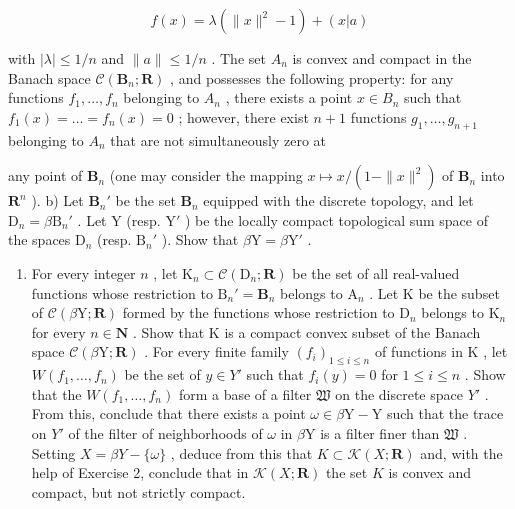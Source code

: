 \[
f (x) = \lambda (\| x \| ^ {2} - 1) + (x | a)
\]

with \(|\lambda| \leqslant 1/n\) and \(\|a\| \leqslant 1/n\) . The set \(A_n\) is convex and compact in the Banach space \(\mathcal{C}(\mathbf{B}_n; \mathbf{R})\) , and possesses the following property: for any functions \(f_1, \ldots, f_n\) belonging to \(A_n\) , there exists a point \(x \in B_n\) such that \(f_1(x) = \ldots = f_n(x) = 0\) ; however, there exist \(n + 1\) functions \(g_1, \ldots, g_{n+1}\) belonging to \(A_n\) that are not simultaneously zero at

any point of \(\mathbf{B}_n\) (one may consider the mapping \(x \mapsto x / (1 - \|x\|^2)\) of \(\mathbf{B}_n\) into \(\mathbf{R}^n\) ). b) Let \(\mathbf{B}_n'\) be the set \(\mathbf{B}_n\) equipped with the discrete topology, and let \(\mathrm{D}_n = \beta \mathrm{B}_n'\) . Let Y (resp. \(\mathrm{Y}'\) ) be the locally compact topological sum space of the spaces \(\mathrm{D}_n\) (resp. \(\mathrm{B}_n'\) ). Show that \(\beta \mathrm{Y} = \beta \mathrm{Y}'\) .

\begin{enumerate}
\def\labelenumi{\alph{enumi})}
\setcounter{enumi}{2}
\tightlist
\item
  For every integer \(n\) , let \(\mathrm{K}_n \subset \mathcal{C}(\mathrm{D}_n; \mathbf{R})\) be the set of all real-valued functions whose restriction to \(\mathrm{B}_n' = \mathbf{B}_n\) belongs to \(\mathrm{A}_n\) . Let \(\mathrm{K}\) be the subset of \(\mathcal{C}(\beta\mathrm{Y}; \mathbf{R})\) formed by the functions whose restriction to \(\mathrm{D}_n\) belongs to \(\mathrm{K}_n\) for every \(n \in \mathbf{N}\) . Show that \(\mathrm{K}\) is a compact convex subset of the Banach space \(\mathcal{C}(\beta\mathrm{Y}; \mathbf{R})\) . For every finite family \((f_i)_{1 \leqslant i \leqslant n}\) of functions in \(\mathrm{K}\) , let \(W(f_1, \ldots, f_n)\) be the set of \(y \in Y'\) such that \(f_i(y) = 0\) for \(1 \leqslant i \leqslant n\) . Show that the \(W(f_1, \ldots, f_n)\) form a base of a filter \(\mathfrak{W}\) on the discrete space \(Y'\) . From this, conclude that there exists a point \(\omega \in \beta\mathrm{Y} - \mathrm{Y}\) such that the trace on \(Y'\) of the filter of neighborhoods of \(\omega\) in \(\beta\mathrm{Y}\) is a filter finer than \(\mathfrak{W}\) . Setting \(X = \beta Y - \{\omega\}\) , deduce from this that \(K \subset \mathcal{K}(X; \mathbf{R})\) and, with the help of Exercise 2, conclude that in \(\mathcal{K}(X; \mathbf{R})\) the set \(K\) is convex and compact, but not strictly compact.
\end{enumerate}


